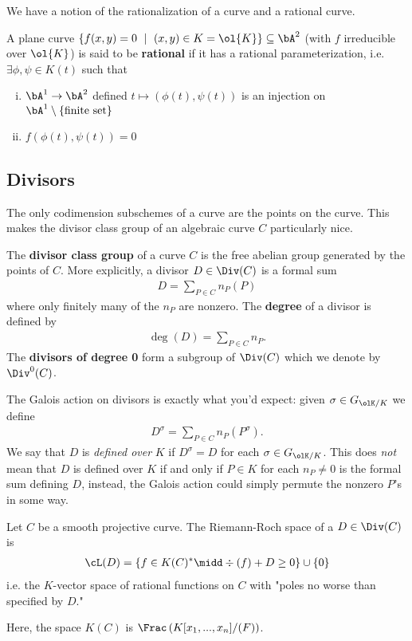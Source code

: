 We have a notion of the rationalization of a curve and a rational curve.
\begin{defn}\label{defn:plane-curve-rational}
	A plane curve $\{f(x,y) = 0 ~\mid~ (x,y) \in K = \ol{K}\} \subseteq \bA^2$ (with $f$ irreducible over $\ol{K}$) is said to be \textbf{rational} if it has a rational parameterization, i.e. $\exists \phi, \psi \in K(t)$ such that

	\begin{enumerate}[(i)]
		\item $\bA^1\to \bA^2$ defined $t \mapsto (\phi(t), \psi(t))$ is an injection on $\bA^1\setminus \{\text{finite set}\}$
		\item $f(\phi(t),\psi(t)) = 0$
	\end{enumerate}
\end{defn}

\subsection{Divisors}
The only codimension subschemes of a curve are the points on the curve. This makes the divisor class group of an algebraic curve $C$ particularly nice.
\begin{defn}\label{defn:divisor-group-of-curve}
	The \textbf{divisor class group} of a curve $C$ is the free abelian group generated by the points of $C$. More explicitly, a divisor $D \in \Div(C)$ is a formal sum
	\begin{align*}
		D = \sum_{P \in C} n_P(P)
	\end{align*}
	where only finitely many of the $n_P$ are nonzero. The \textbf{degree} of a divisor is defined by
	\begin{align*}
		\deg(D) = \sum_{P\in C} n_P.
	\end{align*}
	The \textbf{divisors of degree 0} form a subgroup of $\Div(C)$ which we denote by $\Div^0(C)$.
\end{defn}
The Galois action on divisors is exactly what you'd expect: given $\sigma \in G_{\olK/K}$ we define
\begin{align*}
	D^\sigma = \sum_{ P\in C } n_P(P^\sigma).
\end{align*}
We say that $D$ is \emph{defined over} $K$ if $D^\sigma = D$ for each $\sigma \in G_{\olK/K}$. This does \emph{not} mean that $D$ is defined over $K$ if and only if $P \in K$ for each $n_P \neq 0$ is the formal sum defining $D$, instead, the Galois action could simply permute the nonzero  $P$'s in some way.

\begin{defn}\label{defn:reim-roch-space}
	Let $C$ be a smooth projective curve. The Riemann-Roch space of a $D \in \Div(C)$ is
	\begin{align*}
		\cL(D) = \left\{f \in K(C)^* \midd \div(f) + D \geq 0\right\} \cup \left\{0\right\}
	\end{align*}
	i.e. the $K$-vector space of rational functions on $C$ with "poles no worse than specified by $D$."
\end{defn}
Here, the space $K(C)$ is $\Frac\left(K[x_1,...,x_n]/(F)\right)$.

